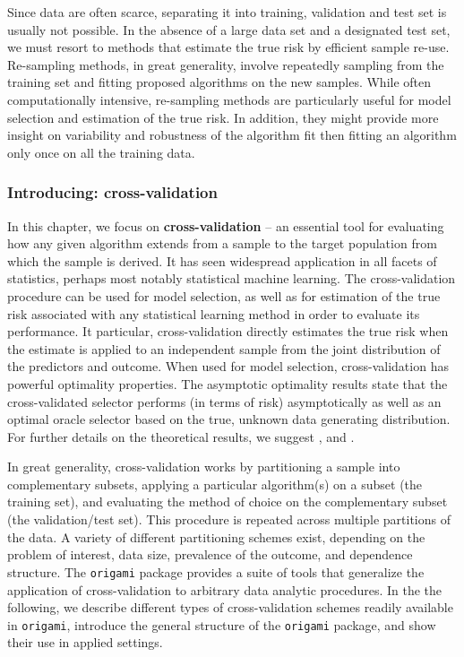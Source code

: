 \documentclass[12pt, krantz2,]{krantz}
\theoremstyle{definition}
\theoremstyle{definition}
\theoremstyle{definition}
\newcommand{\1}{\mathbbm{1}}
\begin{document}
Since data are often scarce, separating it into training, validation and test
set is usually not possible. In the absence of a large data set and a designated
test set, we must resort to methods that estimate the true risk by efficient
sample re-use. Re-sampling methods, in great generality, involve repeatedly
sampling from the training set and fitting proposed algorithms on the new
samples. While often computationally intensive, re-sampling methods are
particularly useful for model selection and estimation of the true risk. In
addition, they might provide more insight on variability and robustness of the
algorithm fit then fitting an algorithm only once on all the training data.

\hypertarget{introducing-cross-validation}{%
\subsubsection{Introducing: cross-validation}\label{introducing-cross-validation}}

In this chapter, we focus on \textbf{cross-validation} -- an essential tool for
evaluating how any given algorithm extends from a sample to the target
population from which the sample is derived. It has seen widespread application
in all facets of statistics, perhaps most notably statistical machine learning.
The cross-validation procedure can be used for model selection, as well as for
estimation of the true risk associated with any statistical learning method in
order to evaluate its performance. It particular, cross-validation directly
estimates the true risk when the estimate is applied to an independent sample
from the joint distribution of the predictors and outcome. When used for model
selection, cross-validation has powerful optimality properties. The asymptotic
optimality results state that the cross-validated selector performs (in terms of
risk) asymptotically as well as an optimal oracle selector based on the true,
unknown data generating distribution. For further details on the theoretical
results, we suggest \citet{vdl2004asymptotic}, \citet{dudoit2005asymptotics} and
\citet{vaart2006oracle}.

In great generality, cross-validation works by partitioning a sample into
complementary subsets, applying a particular algorithm(s) on a subset (the
training set), and evaluating the method of choice on the complementary subset
(the validation/test set). This procedure is repeated across multiple partitions
of the data. A variety of different partitioning schemes exist, depending on the
problem of interest, data size, prevalence of the outcome, and dependence
structure. The \texttt{origami} package provides a suite of tools that generalize the
application of cross-validation to arbitrary data analytic procedures. In the
the following, we describe different types of cross-validation schemes readily
available in \texttt{origami}, introduce the general structure of the \texttt{origami}
package, and show their use in applied settings.
\end{document}
